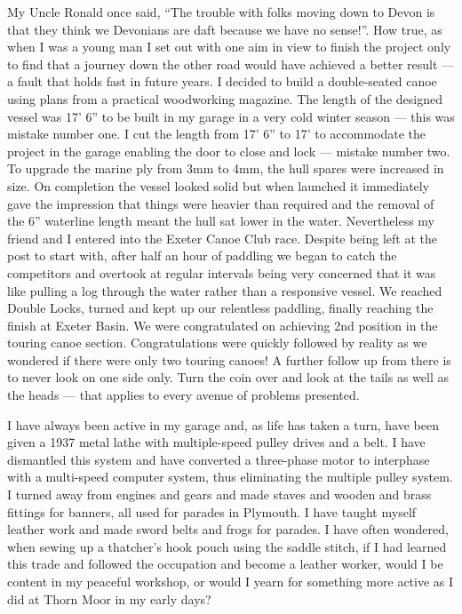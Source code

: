 
My Uncle Ronald once said, ``The trouble with folks moving down to Devon is that
they think we Devonians are daft because we have no sense!''. How true, as when
I was a young man I set out with one aim in view to finish the project only to
find that a journey down the other road would have achieved a better result ---
a fault that holds fast in future years. I decided to build a double-seated
canoe using plans from a practical woodworking magazine. The length of the
designed vessel was 17' 6'' to be built in my garage in a very cold winter
season --- this was mistake number one. I cut the length from 17' 6'' to 17' to
accommodate the project in the garage enabling the door to close and lock ---
mistake number two. To upgrade the marine ply from 3mm to 4mm, the hull spares
were increased in size. On completion the vessel looked solid but when launched
it immediately gave the impression that things were heavier than required and
the removal of the 6'' waterline length meant the hull sat lower in the water.
Nevertheless my friend and I entered into the Exeter Canoe Club race. Despite
being left at the post to start with, after half an hour of paddling we began
to catch the competitors and overtook at regular intervals being very concerned
that it was like pulling a log through the water rather than a responsive
vessel. We reached Double Locks, turned and kept up our relentless paddling,
finally reaching the finish at Exeter Basin. We were congratulated on achieving
2nd position in the touring canoe section. Congratulations were quickly
followed by reality as we wondered if there were only two touring canoes! A
further follow up from there is to never look on one side only. Turn the coin
over and look at the tails as well as the heads --- that applies to every
avenue of problems presented.

I have always been active in my garage and, as life has taken a turn, have been
given a 1937 metal lathe with multiple-speed pulley drives and a belt. I have
dismantled this system and have converted a three-phase motor to interphase
with a multi-speed computer system, thus eliminating the multiple pulley
system. I turned away from engines and gears and made staves and wooden and
brass fittings for banners, all used for parades in Plymouth. I have taught
myself leather work and made sword belts and frogs for parades. I have often
wondered, when sewing up a thatcher's hook pouch using the saddle stitch, if I
had learned this trade and followed the occupation and become a leather worker,
would I be content in my peaceful workshop, or would I yearn for something more
active as I did at Thorn Moor in my early days?

